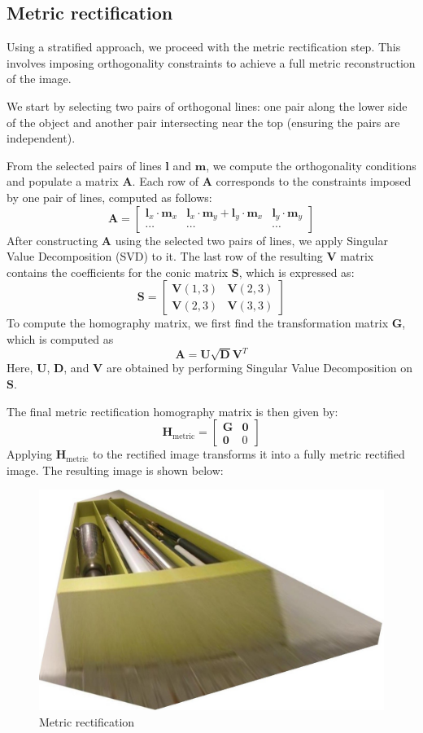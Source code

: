 \subsection{Metric rectification}
Using a stratified approach, we proceed with the metric rectification step. 
This involves imposing orthogonality constraints to achieve a full metric reconstruction of the image.

We start by selecting two pairs of orthogonal lines: one pair along the lower side of the object and another pair intersecting near the top (ensuring the pairs are independent). 

From the selected pairs of lines $\mathbf{l}$ and $\mathbf{m}$, we compute the orthogonality conditions and populate a matrix $\mathbf{A}$.
Each row of $\mathbf{A}$ corresponds to the constraints imposed by one pair of lines, computed as follows:
\[\mathbf{A} = \begin{bmatrix} \mathbf{l}_x \cdot \mathbf{m}_x & \mathbf{l}_x \cdot \mathbf{m}_y + \mathbf{l}_y \cdot \mathbf{m}_x & \mathbf{l}_y \cdot \mathbf{m}_y \\ \cdots & \cdots & \cdots\end{bmatrix}\]
After constructing $\mathbf{A}$ using the selected two pairs of lines, we apply Singular Value Decomposition (SVD) to it.
The last row of the resulting $\mathbf{V}$ matrix contains the coefficients for the conic matrix $\mathbf{S}$, which is expressed as:
\[\mathbf{S}=\begin{bmatrix}
    \mathbf{V}(1,3) & \mathbf{V}(2,3) \\ \mathbf{V}(2,3) & \mathbf{V}(3,3)
\end{bmatrix}\]
To compute the homography matrix, we first find the transformation matrix $\mathbf{G}$, which is computed as
\[\mathbf{A}= \mathbf{U}\sqrt{\mathbf{D}}\mathbf{V}^T\]
Here, $\mathbf{U}$, $\mathbf{D}$, and $\mathbf{V}$ are obtained by performing Singular Value Decomposition on $\mathbf{S}$. 

The final metric rectification homography matrix is then given by:
\[\mathbf{H}_{\text{metric}}=\begin{bmatrix}
    \mathbf{G} & \mathbf{0} \\
    \mathbf{0} & 0
\end{bmatrix}\]
Applying $\mathbf{H}_{\text{metric}}$ to the rectified image transforms it into a fully metric rectified image. 
The resulting image is shown below:
\begin{figure}[H]
    \centering
    \includegraphics[width=0.75\linewidth]{images/metric.jpg}
    \caption{Metric rectification}
\end{figure}

